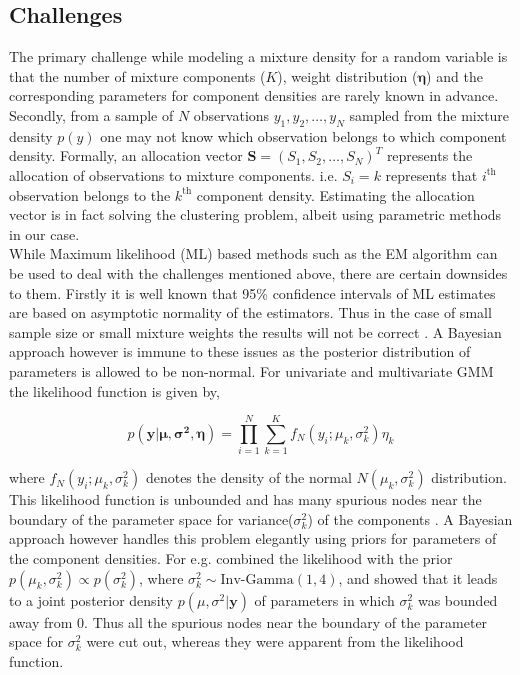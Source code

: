 \subsection{Challenges}
\label{subsec : challenges_mixture_density}
The primary challenge while modeling a mixture density for a random variable is that the number of mixture components ($K$), weight distribution ($\boldsymbol{\eta}$) and the corresponding parameters for component densities are rarely known in advance. Secondly, from a sample of $N$ observations $y_1, y_2, \ldots, y_N$ sampled from the mixture density $p(y)$ one may not know which observation belongs to which component density. Formally, an allocation vector $\boldsymbol{S} = (S_1, S_2, \ldots, S_N)^T$ represents the allocation of observations to mixture components. i.e. $S_i = k$ represents that $i^\text{th}$ observation belongs to the $k^\text{th}$ component density. Estimating the allocation vector is in fact solving the clustering problem, albeit using parametric methods in our case.\\

While Maximum likelihood (ML) based methods such as the EM algorithm can be used to deal with the challenges mentioned above, there are certain downsides to them. Firstly it is well known that 95\% confidence intervals of ML estimates are based on asymptotic normality of the estimators. Thus in the case of small sample size or small mixture weights the results will not be correct \citep[pg. 35]{fruhwirth-schnatter_finite_2013}. A Bayesian approach however is immune to these issues as the posterior distribution of parameters is allowed to be non-normal. For univariate and multivariate GMM the likelihood function is given by,

$$ p(\boldsymbol{y}|\boldsymbol{\mu}, \boldsymbol{\sigma^2}, \boldsymbol{\eta}) = \prod_{i=1}^{N} \sum_{k=1}^{K} f_N(y_i; \mu_k, \sigma^2_k) \eta_k$$

where $f_N(y_i; \mu_k, \sigma^2_k)$ denotes the density of the normal $N(\mu_k, \sigma^2_k)$ distribution. This likelihood function is unbounded and has many spurious nodes near the boundary of the parameter space for variance($\sigma^2_k$) of the components \citep{kiefer_consistency_1956,day_estimating_1969}. A Bayesian approach however handles this problem elegantly using priors for parameters of the component densities. For e.g. \citet[pg. 176]{fruhwirth-schnatter_finite_2013} combined the likelihood with the prior $p(\mu_k, \sigma^2_k) \propto p(\sigma^2_k)$, where $\sigma^2_k \sim \text{Inv-Gamma}(1,4)$, and showed that it leads to a joint posterior density $p(\mu, \sigma^2 | \boldsymbol{y})$ of parameters in which $\sigma^2_k$ was bounded away from 0. Thus all the spurious nodes near the boundary of the parameter space for $\sigma^2_k$ were cut out, whereas they were apparent from the likelihood function.

